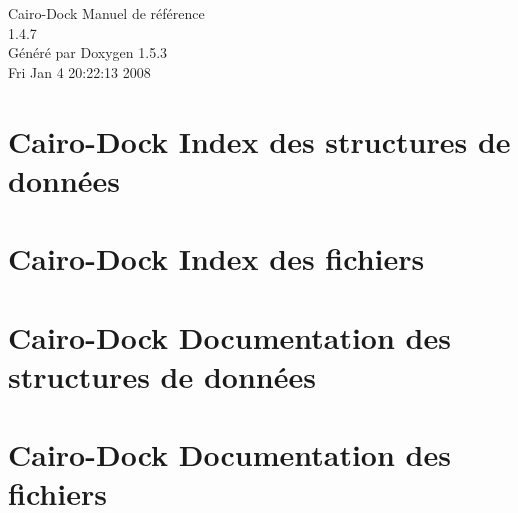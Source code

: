 \documentclass[a4paper]{book}
\begin{document}
\begin{titlepage}
\vspace*{7cm}
\begin{center}
{\Large Cairo-Dock Manuel de référence\\[1ex]\large 1.4.7 }\\
\vspace*{1cm}
{\large Généré par Doxygen 1.5.3}\\
\vspace*{0.5cm}
{\small Fri Jan 4 20:22:13 2008}\\
\end{center}
\end{titlepage}
\clearemptydoublepage
{}
\tableofcontents
\clearemptydoublepage
{}
\chapter{Cairo-Dock Index des structures de données}

\chapter{Cairo-Dock Index des fichiers}

\chapter{Cairo-Dock Documentation des structures de données}






\chapter{Cairo-Dock Documentation des fichiers}




























\printindex
\end{document}
